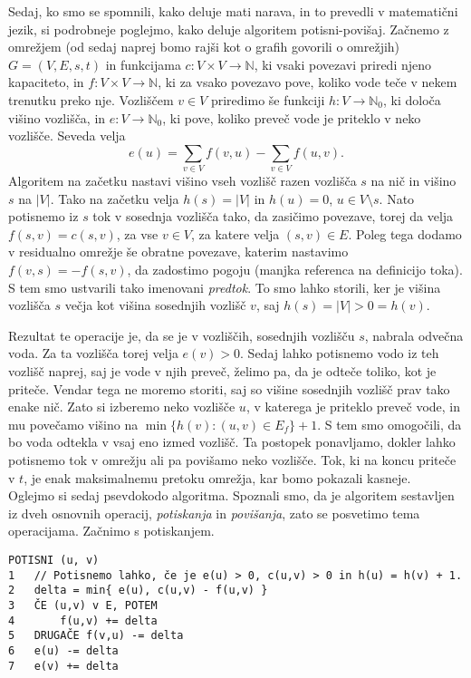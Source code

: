 \documentclass[mat1]{fmfdelo}
\newcommand{\N}{\mathbb N}
\begin{document}
Sedaj, ko smo se spomnili, kako deluje mati narava, in to prevedli v matematični jezik, si podrobneje poglejmo, kako deluje algoritem potisni-povišaj. Začnemo z omrežjem (od sedaj naprej bomo rajši kot o grafih govorili o omrežjih) $G = (V, E, s, t)$ in funkcijama $c\colon V \times V \rightarrow \N$, ki vsaki povezavi priredi njeno kapaciteto, in $f\colon V \times V \rightarrow \N$, ki za vsako povezavo pove, koliko vode teče v nekem trenutku preko nje. Vozliščem $v \in V$ priredimo še funkciji $h\colon V \rightarrow \N_0$, ki določa višino vozlišča, in $e\colon V \rightarrow \N_0$, ki pove, koliko preveč vode je priteklo v neko vozlišče. Seveda velja \[e(u) = \sum_{v \in V} f(v,u) - \sum_{v \in V} f(u,v).\] Algoritem na začetku nastavi višino vseh vozlišč razen vozlišča $s$ na nič in višino $s$ na $|V|$. Tako na začetku velja $h(s) = |V|$ in $h(u) = 0$, $u \in V \setminus {s}$. Nato potisnemo iz $s$ tok v sosednja vozlišča tako, da zasičimo povezave, torej da velja $f(s, v) = c(s, v)$, za vse $v \in V$, za katere velja $(s, v) \in E$. Poleg tega dodamo v residualno omrežje še obratne povezave, katerim nastavimo $f(v,s) = -f(s,v)$, da zadostimo pogoju (manjka referenca na definicijo toka). S tem smo ustvarili tako imenovani \textit{predtok}. To smo lahko storili, ker je višina vozlišča $s$ večja kot višina sosednjih vozlišč $v$, saj $h(s) = |V| > 0 = h(v)$.

Rezultat te operacije je, da se je v vozliščih, sosednjih vozlišču $s$, nabrala odvečna voda. Za ta vozlišča torej velja $e(v) > 0$. Sedaj lahko potisnemo vodo iz teh vozlišč naprej, saj je vode v njih preveč, želimo pa, da je odteče toliko, kot je priteče. Vendar tega ne moremo storiti, saj so višine sosednjih vozlišč prav tako enake nič. Zato si izberemo neko vozlišče $u$, v katerega je priteklo preveč vode, in mu povečamo višino na $\min\{h(v) : (u,v) \in E_f\} + 1$. S tem smo omogočili, da bo voda odtekla v vsaj eno izmed vozlišč. Ta postopek ponavljamo, dokler lahko potisnemo tok v omrežju ali pa povišamo neko vozlišče. Tok, ki na koncu priteče v $t$, je enak maksimalnemu pretoku omrežja, kar bomo pokazali kasneje.\\

Oglejmo si sedaj psevdokodo algoritma. Spoznali smo, da je algoritem sestavljen iz dveh osnovnih operacij, \textit{potiskanja} in \textit{povišanja}, zato se posvetimo tema operacijama. Začnimo s potiskanjem.\\

\begin{verbatim}
POTISNI (u, v)
1   // Potisnemo lahko, če je e(u) > 0, c(u,v) > 0 in h(u) = h(v) + 1.
2   delta = min{ e(u), c(u,v) - f(u,v) }
3   ČE (u,v) v E, POTEM
4       f(u,v) += delta
5   DRUGAČE f(v,u) -= delta
6   e(u) -= delta
7   e(v) += delta
\end{verbatim}~
\end{document}
